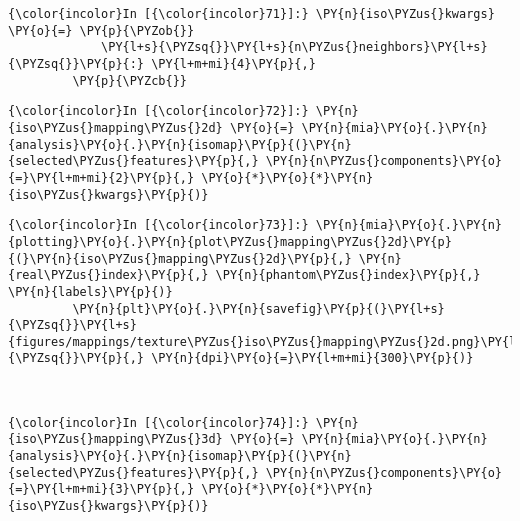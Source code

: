     \begin{Verbatim}[commandchars=\\\{\}]
{\color{incolor}In [{\color{incolor}71}]:} \PY{n}{iso\PYZus{}kwargs} \PY{o}{=} \PY{p}{\PYZob{}}
             \PY{l+s}{\PYZsq{}}\PY{l+s}{n\PYZus{}neighbors}\PY{l+s}{\PYZsq{}}\PY{p}{:} \PY{l+m+mi}{4}\PY{p}{,}
         \PY{p}{\PYZcb{}}
\end{Verbatim}

    \begin{Verbatim}[commandchars=\\\{\}]
{\color{incolor}In [{\color{incolor}72}]:} \PY{n}{iso\PYZus{}mapping\PYZus{}2d} \PY{o}{=} \PY{n}{mia}\PY{o}{.}\PY{n}{analysis}\PY{o}{.}\PY{n}{isomap}\PY{p}{(}\PY{n}{selected\PYZus{}features}\PY{p}{,} \PY{n}{n\PYZus{}components}\PY{o}{=}\PY{l+m+mi}{2}\PY{p}{,} \PY{o}{*}\PY{o}{*}\PY{n}{iso\PYZus{}kwargs}\PY{p}{)}
\end{Verbatim}

    \begin{Verbatim}[commandchars=\\\{\}]
{\color{incolor}In [{\color{incolor}73}]:} \PY{n}{mia}\PY{o}{.}\PY{n}{plotting}\PY{o}{.}\PY{n}{plot\PYZus{}mapping\PYZus{}2d}\PY{p}{(}\PY{n}{iso\PYZus{}mapping\PYZus{}2d}\PY{p}{,} \PY{n}{real\PYZus{}index}\PY{p}{,} \PY{n}{phantom\PYZus{}index}\PY{p}{,} \PY{n}{labels}\PY{p}{)}
         \PY{n}{plt}\PY{o}{.}\PY{n}{savefig}\PY{p}{(}\PY{l+s}{\PYZsq{}}\PY{l+s}{figures/mappings/texture\PYZus{}iso\PYZus{}mapping\PYZus{}2d.png}\PY{l+s}{\PYZsq{}}\PY{p}{,} \PY{n}{dpi}\PY{o}{=}\PY{l+m+mi}{300}\PY{p}{)}
\end{Verbatim}

    \begin{center}
    \end{center}
    { \hspace*{\fill} \\}

    \begin{Verbatim}[commandchars=\\\{\}]
{\color{incolor}In [{\color{incolor}74}]:} \PY{n}{iso\PYZus{}mapping\PYZus{}3d} \PY{o}{=} \PY{n}{mia}\PY{o}{.}\PY{n}{analysis}\PY{o}{.}\PY{n}{isomap}\PY{p}{(}\PY{n}{selected\PYZus{}features}\PY{p}{,} \PY{n}{n\PYZus{}components}\PY{o}{=}\PY{l+m+mi}{3}\PY{p}{,} \PY{o}{*}\PY{o}{*}\PY{n}{iso\PYZus{}kwargs}\PY{p}{)}
\end{Verbatim}

